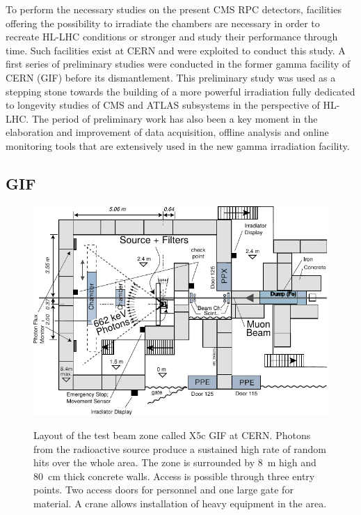 	To perform the necessary studies on the present CMS RPC detectors, facilities offering the possibility to irradiate the chambers are necessary in order to recreate HL-LHC conditions or stronger and study their performance through time. Such facilities exist at CERN and were exploited to conduct this study. A first series of preliminary studies were conducted in the former gamma facility of CERN (GIF) before its dismantlement. This preliminary study was used as a stepping stone towards the building of a more powerful irradiation fully dedicated to longevity studies of CMS and ATLAS subsystems in the perspective of HL-LHC. The period of preliminary work has also been a key moment in the elaboration and improvement of data acquisition, offline analysis and online monitoring tools that are extensively used in the new gamma irradiation facility.
	
		\subsection{GIF}
		\label{chapt5:ssec:GIF}
	
	\begin{figure}[H]
		\centering
		\includegraphics[width = \plotwidth]{fig/chapt5/GIF-Layout.pdf}\\
		\caption{\label{fig:GIFLayout} Layout of the test beam zone called X5c GIF at CERN. Photons from the radioactive source produce a sustained high rate of random hits over the whole area. The zone is surrounded by \SI{8}{m} high and \SI{80}{cm} thick concrete walls. Access is possible through three entry points. Two access doors for personnel and one large gate for material. A crane allows installation of heavy equipment in the area.}
	\end{figure}
		
